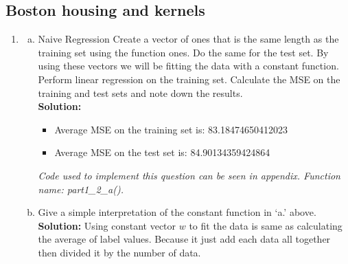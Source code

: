 \documentclass[A4,12pt]{article}
\begin{document}
\subsection{Boston housing and kernels}
\begin{enumerate}[4.]
\item 
  \begin{enumerate}[a.]
    \item Naive Regression Create a vector of ones that is the same length as the training set using the function ones. Do the same for the test set. By using these vectors we will be fitting the data with a constant function. Perform linear regression on the training set. Calculate the MSE on the training and test sets and note down the results.\\
    \textbf{Solution:}
    \begin{itemize}
      \item Average MSE on the training set is: 83.18474650412023
      \item Average MSE on the test set is: 84.90134359424864
    \end{itemize}
    \textit{Code used to implement this question can be seen in appendix. Function name: part1\_2\_a().}
    
    \item Give a simple interpretation of the constant function in ‘a.’ above.\\
    \textbf{Solution:} 
       Using constant vector $w$ to fit the data is same as calculating the average of label values. Because it just add each data all together then divided it by the number of data.


\end{enumerate}
\end{enumerate}
\end{document}
